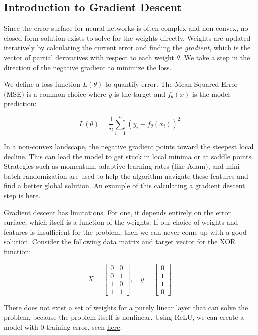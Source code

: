 \subsection{Introduction to Gradient Descent}

\medskip

Since the error surface for neural networks is often complex and non-convex, no closed-form solution exists to solve for the weights directly. Weights are updated iteratively by calculating the current error and finding the \textit{gradient}, which is the vector of partial derivatives with respect to each weight $\theta$. We take a step in the direction of the negative gradient to minimize the loss.

We define a loss function $L(\theta)$ to quantify error. The Mean Squared Error (MSE) is a common choice where $y$ is the target and $f_\theta(x)$ is the model prediction:

$$L(\theta) = \frac{1}{n} \sum_{i=1}^n (y_i - f_\theta(x_i))^2$$

In a non-convex landscape, the negative gradient points toward the steepest local decline. This can lead the model to get stuck in local minima or at saddle points. Strategies such as momentum, adaptive learning rates (like Adam), and mini-batch randomization are used to help the algorithm navigate these features and find a better global solution. An example of this calculating a gradient descent step is \hyperref[worked-gradient-descent]{here}.

Gradient descent has limitations. For one, it depends entirely on the error surface, which itself is a function of the weights. If our choice of weights and features is insufficient for the problem, then we can never come up with a good solution. Consider the following data matrix and target vector for the XOR function:

\[
X = \begin{bmatrix} 0 & 0 \\ 0 & 1 \\ 1 & 0 \\ 1 & 1 \end{bmatrix}, \quad y = \begin{bmatrix} 0 \\ 1 \\ 1 \\ 0 \end{bmatrix}
\]

There does not exist a set of weights for a purely linear layer that can solve the problem, because the problem itself is nonlinear. Using ReLU, we can create a model with 0 training error, seen \hyperref[worked-XOR-relu-model]{here}.

